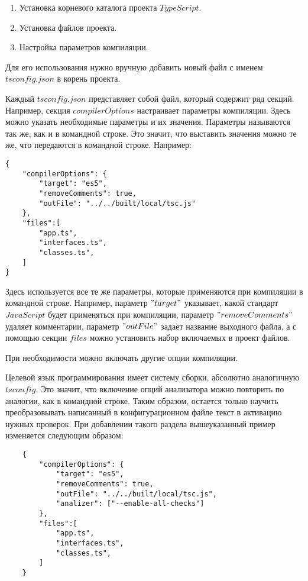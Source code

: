 \documentclass{mipt-thesis-bs}
\begin{document}
\begin{enumerate}
    \item Установка корневого каталога проекта $TypeScript$.
    \item Установка файлов проекта.
    \item Настройка параметров компиляции.
\end{enumerate}

Для его использования нужно вручную добавить новый файл с именем $tsconfig.json$ в корень проекта.


Каждый $tsconfig.json$ представляет собой файл, который содержит ряд секций. 
Например, секция $compilerOptions$ настраивает параметры компиляции. 
Здесь можно указать необходимые параметры и их значения. 
Параметры называются так же, как и в командной строке. 
Это значит, что выставить значения можно те же, что передаются в командной строке. Например:

\begin{verbatim}
{
    "compilerOptions": {
        "target": "es5",
        "removeComments": true,
        "outFile": "../../built/local/tsc.js"
    },
    "files":[
        "app.ts",
        "interfaces.ts",
        "classes.ts",
    ]
}
\end{verbatim}

Здесь используется все те же параметры, которые применяются при компиляции в 
командной строке. Например, параметр $"target"$ 
указывает, какой стандарт $JavaScript$ будет применяться при компиляции, параметр 
$"removeComments"$ удаляет комментарии, параметр $"outFile"$ задает название выходного файла, а 
с помощью секции $files$ можно установить набор включаемых в проект файлов.

При необходимости можно включать другие опции компиляции.

Целевой язык программирования имеет систему сборки, абсолютно аналогичную $tsconfig$. Это значит, 
что включение опций анализатора можно повторить по аналогии, как в командной строке. Таким образом, 
остается только научить преобразовывать написанный в конфигурационном файле текст в активацию 
нужных проверок. При добавлении такого раздела вышеуказанный пример изменяется 
следующим образом:

\begin{verbatim}
    {
        "compilerOptions": {
            "target": "es5",
            "removeComments": true,
            "outFile": "../../built/local/tsc.js",
            "analizer": ["--enable-all-checks"]
        },
        "files":[
            "app.ts",
            "interfaces.ts",
            "classes.ts",
        ]
    }
    \end{verbatim}
\end{document}
